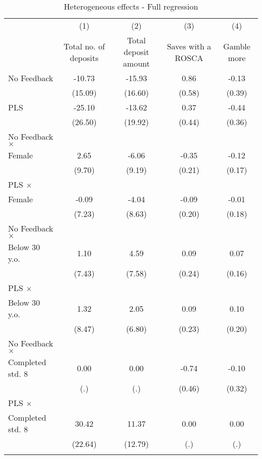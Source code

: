 \begin{table}[htbp]\centering
\caption{Heterogeneous effects - Full regression}
\begin{tabular}{l*{4}{c}}
\toprule
                &\multicolumn{1}{c}{(1)}&\multicolumn{1}{c}{(2)}&\multicolumn{1}{c}{(3)}&\multicolumn{1}{c}{(4)}\\
                &\multicolumn{1}{c}{Total no. of deposits}&\multicolumn{1}{c}{Total deposit amount}&\multicolumn{1}{c}{Saves with a ROSCA}&\multicolumn{1}{c}{Gamble more}\\
\midrule
No Feedback     &   -10.73&   -15.93&     0.86&    -0.13\\
                &  (15.09)&  (16.60)&   (0.58)&   (0.39)\\
\addlinespace
PLS             &   -25.10&   -13.62&     0.37&    -0.44\\
                &  (26.50)&  (19.92)&   (0.44)&   (0.36)\\
\addlinespace
No Feedback $\times$ \\ Female&     2.65&    -6.06&    -0.35&    -0.12\\
                &   (9.70)&   (9.19)&   (0.21)&   (0.17)\\
\addlinespace
PLS $\times$ \\ Female&    -0.09&    -4.04&    -0.09&    -0.01\\
                &   (7.23)&   (8.63)&   (0.20)&   (0.18)\\
\addlinespace
No Feedback $\times$ \\ Below 30 y.o.&     1.10&     4.59&     0.09&     0.07\\
                &   (7.43)&   (7.58)&   (0.24)&   (0.16)\\
\addlinespace
PLS $\times$ \\ Below 30 y.o.&     1.32&     2.05&     0.09&     0.10\\
                &   (8.47)&   (6.80)&   (0.23)&   (0.20)\\
\addlinespace
No Feedback $\times$ \\ Completed std. 8&     0.00&     0.00&    -0.74&    -0.10\\
                &      (.)&      (.)&   (0.46)&   (0.32)\\
\addlinespace
PLS $\times$ \\ Completed std. 8&    30.42&    11.37&     0.00&     0.00\\
                &  (22.64)&  (12.79)&      (.)&      (.)\\
\addlinespace

\end{tabular}
\end{table}
